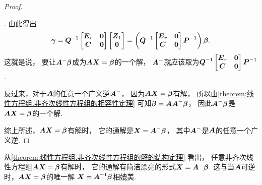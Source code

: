 \begin{theorem}[非齐次线性方程组的解的结构定理]
\begin{proof}
\begin{bmatrix}
	\end{bmatrix}
\).
由此得出\begin{equation*}
	\boldsymbol\gamma
	= \boldsymbol{Q}^{-1}
	\begin{bmatrix}
		\boldsymbol{E}_r & \boldsymbol0 \\
		\boldsymbol{C} & \boldsymbol0
	\end{bmatrix}
	\begin{bmatrix}
		\boldsymbol{Z}_1 \\
		\boldsymbol0
	\end{bmatrix}
	= \left(
		\boldsymbol{Q}^{-1}
		\begin{bmatrix}
			\boldsymbol{E}_r & \boldsymbol0 \\
			\boldsymbol{C} & \boldsymbol0
		\end{bmatrix}
		\boldsymbol{P}^{-1}
	\right)
	\boldsymbol\beta.
\end{equation*}
这就是说，
要让\(\boldsymbol{A}^- \boldsymbol\beta\)成为\(\boldsymbol{A} \boldsymbol{X} = \boldsymbol\beta\)的一个解，
\(\boldsymbol{A}^-\)就应该取为\(
	\boldsymbol{Q}^{-1}
	\begin{bmatrix}
		\boldsymbol{E}_r & \boldsymbol0 \\
		\boldsymbol{C} & \boldsymbol0
	\end{bmatrix}
	\boldsymbol{P}^{-1}
\).

反过来，对于\(\boldsymbol{A}\)的任意一个广义逆\(\boldsymbol{A}^-\)，
因为\(\boldsymbol{A} \boldsymbol{X} = \boldsymbol\beta\)有解，
所以由\cref{theorem:线性方程组.非齐次线性方程组的相容性定理}
可知\(\boldsymbol\beta = \boldsymbol{A} \boldsymbol{A}^- \boldsymbol\beta\)，
因此\(\boldsymbol{A}^- \boldsymbol\beta\)是\(\boldsymbol{A} \boldsymbol{X} = \boldsymbol\beta\)的一个解.

综上所述，\(\boldsymbol{A} \boldsymbol{X} = \boldsymbol\beta\)有解时，
它的通解是\(\boldsymbol{X} = \boldsymbol{A}^- \boldsymbol\beta\)，
其中\(\boldsymbol{A}^-\)是\(\boldsymbol{A}\)的任意一个广义逆.
\end{proof}
\end{theorem}
从\cref{theorem:线性方程组.非齐次线性方程组的解的结构定理} 看出，
任意非齐次线性方程组\(\boldsymbol{A} \boldsymbol{X} = \boldsymbol\beta\)有解时，
它的通解有简洁漂亮的形式\(\boldsymbol{X} = \boldsymbol{A}^- \boldsymbol\beta\).
这与当\(\boldsymbol{A}\)可逆时，\(\boldsymbol{A} \boldsymbol{X} = \boldsymbol\beta\)的唯一解
\(\boldsymbol{X} = \boldsymbol{A}^{-1} \boldsymbol\beta\)相媲美.

